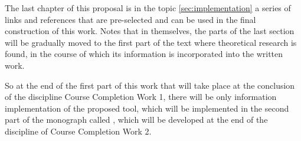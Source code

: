 {    The last chapter of this proposal is in the topic \autoref{sec:implementation}
    a series of links and references that are pre-selected and can be used in the
    final construction of this work. Notes that in themselves, the parts of the last section will be gradually
    moved to the first part of the text where theoretical research is found, in the course of which its
    information is incorporated into the written work.

    So at the end of the first part of this work that will take place at the conclusion of the discipline
    Course Completion Work 1, there will be only information
    implementation of the proposed tool, which will be implemented in the second part of the monograph
    called , which will be developed at the end of the
    discipline of Course Completion Work 2.
}



